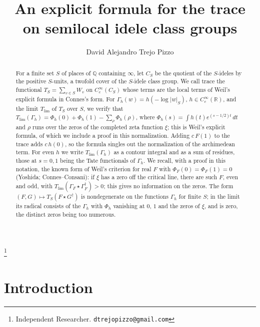 \documentclass[11pt]{amsart}
\theoremstyle{remark}
\numberwithin{equation}{section}
\newcommand{\R}{\mathbb R}
\newcommand{\Q}{\mathbb Q}
\begin{document}
\title[An explicit formula for the trace]{An explicit formula for the
trace on semilocal idele class groups}

\author{David Alejandro Trejo Pizzo}
\thanks{Independent Researcher. \texttt{dtrejopizzo@gmail.com}}


\begin{abstract}
For a finite set $S$ of places of $\Q$ containing $\infty$, let $C_S$ be the
quotient of the $S$-ideles by the positive $S$-units, a twofold cover of the
$S$-idele class group.  We call trace the functional $T_S=\sum_{v\in S}W_v$
on $C_c^\infty(C_S)$ whose terms are the local terms of Weil's explicit
formula in Connes's form.  For $\Gamma_h(w)=h(-\log|w|_S)$,
$h\in C_c^\infty(\R)$, and the limit $T_{\lim}$ of $T_S$ over $S$, we verify
that $T_{\lim}(\Gamma_h)=\Phi_h(0)+\Phi_h(1)-\sum_\rho\Phi_h(\rho)$, where
$\Phi_h(s)=\int h(t)e^{(s-1/2)t}\,dt$ and $\rho$ runs over the zeros of the
completed zeta function $\xi$; this is Weil's explicit formula, of which we
include a proof in this normalization.  Adding $c\,F(1)$ to the trace adds
$c\,h(0)$, so the formula singles out the normalization of the archimedean
term.  For even $h$ we write $T_{\lim}(\Gamma_h)$ as a contour integral and
as a sum of residues, those at $s=0,1$ being the Tate functionals of
$\Gamma_h$.  We recall, with a proof in this notation, the known form of
Weil's criterion for real $F$ with $\Phi_F(0)=\Phi_F(1)=0$ (Yoshida;
Connes--Consani): if $\xi$ has a zero off the critical line, there are such
$F$, even and odd, with $T_{\lim}(\Gamma_F\star\Gamma_F^\dagger)>0$; this
gives no information on the zeros.  The form
$(F,G)\mapsto T_S(F\star G^\dagger)$ is nondegenerate on the functions
$\Gamma_h$ for finite $S$; in the limit its radical consists of the
$\Gamma_h$ with $\Phi_h$ vanishing at $0$, $1$ and the zeros of $\xi$, and
is zero, the distinct zeros being too numerous.
\end{abstract}

\maketitle

\section{Introduction}\enlargethispage{3pt}
\label{sec:intro}
\end{document}
